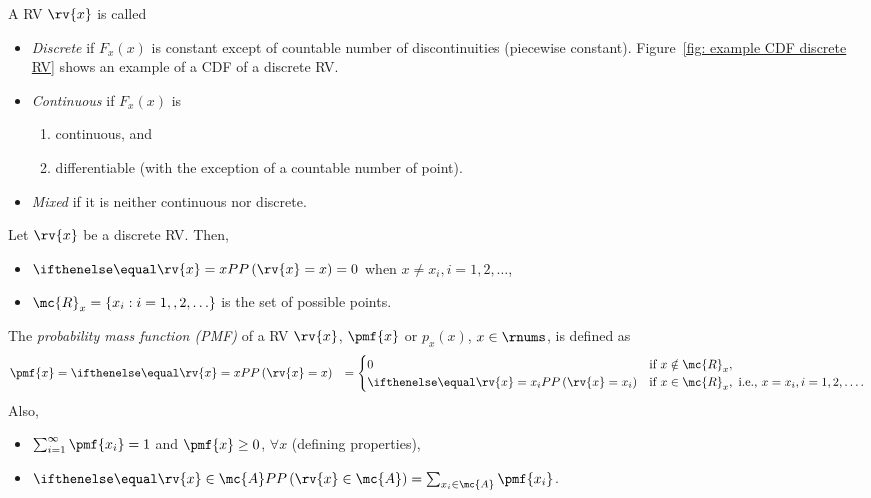 \begin{mydefinition}
  A RV $\rv{x}$ is called 
  \begin{itemize}
      \item \emph{Discrete} if $F_{x}(x)$ is constant except of countable number of discontinuities (piecewise constant). Figure~\ref{fig: example CDF discrete RV} shows an example of a CDF of a discrete RV.
      \item \emph{Continuous} if $F_{x}(x)$ is
      \begin{enumerate}
          \item continuous, and
          \item differentiable (with the exception of a countable number of point).
      \end{enumerate}
      \item \emph{Mixed} if it is neither continuous nor discrete.
  \end{itemize}
\end{mydefinition}

\begin{mydefinition}
  Let $\rv{x}$ be a discrete RV. Then,
  \begin{itemize}
      \item $\prob{\rv{x}=x}=0$ when $x\neq x_{i}, i=1,2,\ldots$, 
      \item $\mc{R}_{x}=\left\{ x_{i} : i=1,,2,\ldots\right\}$ is the set of possible points. 
  \end{itemize}

  The \emph{probability mass function (PMF)} of a RV $\rv{x}$, $\pmf{x}$ or $p_{x}(x)$, $x\in\rnums$, is defined as 
  \begin{align}
      \pmf{x} &= \prob{\rv{x}=x} &= 
      \begin{cases}
          0 & \text{if } x\notin \mc{R}_{x},\\
          \prob{\rv{x}=x_{i}} & \text{if } x\in\mc{R}_{x}, \text{ i.e., } x=x_{i}, i=1,2,\ldots.
      \end{cases}
  \end{align}
  Also,
  \begin{itemize}
      \item $\sum_{i=1}^{\infty}\pmf{x_{i}} = 1$ and $\pmf{x}\geq 0$, $\forall x$ (defining properties),
      \item $\prob{\rv{x}\in \mc{A}}=\sum_{x_{i}\in \mc{A}} \pmf{x_{i}}$.
  \end{itemize}
\end{mydefinition}

